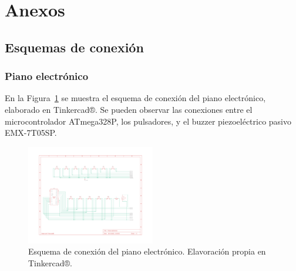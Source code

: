 \newpage

\section{Anexos}

\subsection{Esquemas de conexión}

\subsubsection{Piano electrónico}

En la Figura~\ref{fig:conexion_piano} se muestra el esquema de conexión del piano electrónico, elaborado en Tinkercad®. 
Se pueden observar las conexiones entre el microcontrolador ATmega328P, los pulsadores, y el buzzer piezoeléctrico pasivo EMX-7T05SP.

\begin{figure}[H]
    \centering
    \includegraphics[width=0.5\textwidth]{Anexos/Conexionado_de_piano.pdf}
    \caption{Esquema de conexión del piano electrónico. Elavoración propia en Tinkercad®.}
    \label{fig:conexion_piano}
\end{figure}

